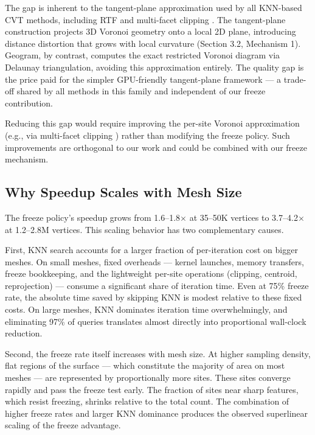 The gap is inherent to the tangent-plane approximation used by all KNN-based CVT methods, including RTF \cite{yao2023rtf} and multi-facet clipping \cite{fei2025adaptive}. The tangent-plane construction projects 3D Voronoi geometry onto a local 2D plane, introducing distance distortion that grows with local curvature (Section 3.2, Mechanism 1). Geogram, by contrast, computes the exact restricted Voronoi diagram via Delaunay triangulation, avoiding this approximation entirely. The quality gap is the price paid for the simpler GPU-friendly tangent-plane framework --- a trade-off shared by all methods in this family and independent of our freeze contribution.

Reducing this gap would require improving the per-site Voronoi approximation (e.g., via multi-facet clipping \cite{fei2025adaptive}) rather than modifying the freeze policy. Such improvements are orthogonal to our work and could be combined with our freeze mechanism.

\subsection{Why Speedup Scales with Mesh Size}

The freeze policy's speedup grows from 1.6--1.8$\times$ at 35--50K vertices to 3.7--4.2$\times$ at 1.2--2.8M vertices. This scaling behavior has two complementary causes.

First, KNN search accounts for a larger fraction of per-iteration cost on bigger meshes. On small meshes, fixed overheads --- kernel launches, memory transfers, freeze bookkeeping, and the lightweight per-site operations (clipping, centroid, reprojection) --- consume a significant share of iteration time. Even at 75\% freeze rate, the absolute time saved by skipping KNN is modest relative to these fixed costs. On large meshes, KNN dominates iteration time overwhelmingly, and eliminating 97\% of queries translates almost directly into proportional wall-clock reduction.

Second, the freeze rate itself increases with mesh size. At higher sampling density, flat regions of the surface --- which constitute the majority of area on most meshes --- are represented by proportionally more sites. These sites converge rapidly and pass the freeze test early. The fraction of sites near sharp features, which resist freezing, shrinks relative to the total count. The combination of higher freeze rates and larger KNN dominance produces the observed superlinear scaling of the freeze advantage.


